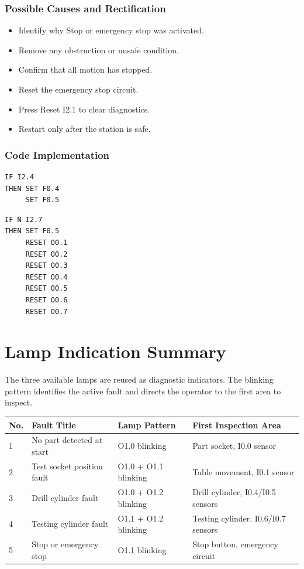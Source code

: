 \subsubsection{Possible Causes and Rectification}

\begin{itemize}
    \item Identify why Stop or emergency stop was activated.
    \item Remove any obstruction or unsafe condition.
    \item Confirm that all motion has stopped.
    \item Reset the emergency stop circuit.
    \item Press Reset I2.1 to clear diagnostics.
    \item Restart only after the station is safe.
\end{itemize}

\subsubsection{Code Implementation}

\begin{verbatim}
IF I2.4
THEN SET F0.4
     SET F0.5
\end{verbatim}

\begin{verbatim}
IF N I2.7
THEN SET F0.5
     RESET O0.1
     RESET O0.2
     RESET O0.3
     RESET O0.4
     RESET O0.5
     RESET O0.6
     RESET O0.7
\end{verbatim}

\section{Lamp Indication Summary}

The three available lamps are reused as diagnostic indicators. The blinking pattern identifies the active fault and directs the operator to the first area to inspect.

\begin{longtable}{|p{0.8cm}|p{4.0cm}|p{3.4cm}|p{4.6cm}|}
\hline
No. & Fault Title & Lamp Pattern & First Inspection Area \\
\hline
1 & No part detected at start & O1.0 blinking & Part socket, I0.0 sensor \\
\hline
2 & Test socket position fault & O1.0 + O1.1 blinking & Table movement, I0.1 sensor \\
\hline
3 & Drill cylinder fault & O1.0 + O1.2 blinking & Drill cylinder, I0.4/I0.5 sensors \\
\hline
4 & Testing cylinder fault & O1.1 + O1.2 blinking & Testing cylinder, I0.6/I0.7 sensors \\
\hline
5 & Stop or emergency stop & O1.1 blinking & Stop button, emergency circuit \\
\hline
\end{longtable}

